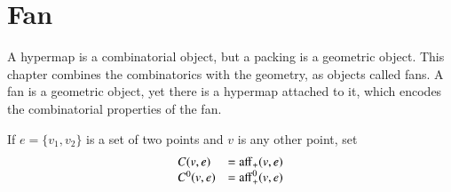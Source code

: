 

\chapter{Fan}\label{sec:fan}

A hypermap is a combinatorial object, but a packing
is a geometric object.  This chapter combines the combinatorics
with the geometry, as objects called fans.  A fan is a geometric
object, yet there is a hypermap attached to it,
which encodes the combinatorial properties of the fan.



If $e=\{v_1,v_2\}$ is a set of two points and $v$ is any other point,
set
  $$
  \begin{array}{lll}
  C(v,e) &= {\operatorname{aff}}_+(v,e)\\
  C^0(v,e) &= {\operatorname{aff}}^0_+(v,e)\\
  \end{array}
  $$

